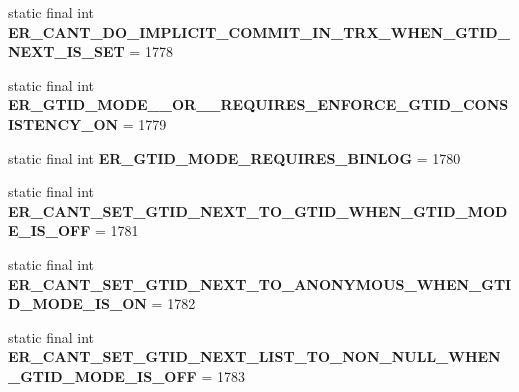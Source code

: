 \begin{DoxyCompactItemize}
static final int {\bfseries E\+R\+\_\+\+C\+A\+N\+T\+\_\+\+D\+O\+\_\+\+I\+M\+P\+L\+I\+C\+I\+T\+\_\+\+C\+O\+M\+M\+I\+T\+\_\+\+I\+N\+\_\+\+T\+R\+X\+\_\+\+W\+H\+E\+N\+\_\+\+G\+T\+I\+D\+\_\+\+N\+E\+X\+T\+\_\+\+I\+S\+\_\+\+S\+ET} = 1778
\item 
\mbox{\label{classcom_1_1mysql_1_1cj_1_1exceptions_1_1_mysql_error_numbers_a008ab6d0ad7ce4cf8033c27332ebe5d3}} 
static final int {\bfseries E\+R\+\_\+\+G\+T\+I\+D\+\_\+\+M\+O\+D\+E\+\_\+\_\+\+O\+R\+\_\+\_\+\+R\+E\+Q\+U\+I\+R\+E\+S\+\_\+\+E\+N\+F\+O\+R\+C\+E\+\_\+\+G\+T\+I\+D\+\_\+\+C\+O\+N\+S\+I\+S\+T\+E\+N\+C\+Y\+\_\+\+ON} = 1779
\item 
\mbox{\label{classcom_1_1mysql_1_1cj_1_1exceptions_1_1_mysql_error_numbers_a24a50dfecc6288881eb9264a4c3378d7}} 
static final int {\bfseries E\+R\+\_\+\+G\+T\+I\+D\+\_\+\+M\+O\+D\+E\+\_\+\+R\+E\+Q\+U\+I\+R\+E\+S\+\_\+\+B\+I\+N\+L\+OG} = 1780
\item 
\mbox{\label{classcom_1_1mysql_1_1cj_1_1exceptions_1_1_mysql_error_numbers_a178011ea3c5f1821b3c7667b32ac56ea}} 
static final int {\bfseries E\+R\+\_\+\+C\+A\+N\+T\+\_\+\+S\+E\+T\+\_\+\+G\+T\+I\+D\+\_\+\+N\+E\+X\+T\+\_\+\+T\+O\+\_\+\+G\+T\+I\+D\+\_\+\+W\+H\+E\+N\+\_\+\+G\+T\+I\+D\+\_\+\+M\+O\+D\+E\+\_\+\+I\+S\+\_\+\+O\+FF} = 1781
\item 
\mbox{\label{classcom_1_1mysql_1_1cj_1_1exceptions_1_1_mysql_error_numbers_a48986e14862ab62bdf1066d7983e5bd4}} 
static final int {\bfseries E\+R\+\_\+\+C\+A\+N\+T\+\_\+\+S\+E\+T\+\_\+\+G\+T\+I\+D\+\_\+\+N\+E\+X\+T\+\_\+\+T\+O\+\_\+\+A\+N\+O\+N\+Y\+M\+O\+U\+S\+\_\+\+W\+H\+E\+N\+\_\+\+G\+T\+I\+D\+\_\+\+M\+O\+D\+E\+\_\+\+I\+S\+\_\+\+ON} = 1782
\item 
\mbox{\label{classcom_1_1mysql_1_1cj_1_1exceptions_1_1_mysql_error_numbers_aa47a6873382f90fc1d1bc9e4052265c2}} 
static final int {\bfseries E\+R\+\_\+\+C\+A\+N\+T\+\_\+\+S\+E\+T\+\_\+\+G\+T\+I\+D\+\_\+\+N\+E\+X\+T\+\_\+\+L\+I\+S\+T\+\_\+\+T\+O\+\_\+\+N\+O\+N\+\_\+\+N\+U\+L\+L\+\_\+\+W\+H\+E\+N\+\_\+\+G\+T\+I\+D\+\_\+\+M\+O\+D\+E\+\_\+\+I\+S\+\_\+\+O\+FF} = 1783

\end{DoxyCompactItemize}
